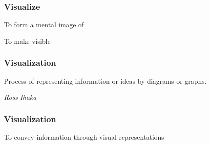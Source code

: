\documentclass[12pt]{beamer}\usepackage[]{graphicx}\usepackage[]{color}
\begin{document}
{ %
    \begin{frame}[plain]
     \end{frame}
}


\begin{frame}
\frametitle{Visualize}

\bbi
  \item To form a mental image of
  \item To make visible
\ei
\eb

\end{frame}


\begin{frame}
\frametitle{Visualization}

\Large Process of representing information or ideas by diagrams or graphs.

\textit{Ross Ihaka}

\end{frame}


\begin{frame}
\frametitle{Visualization}

\Large To convey information through visual representations

\end{frame}
\end{document}
